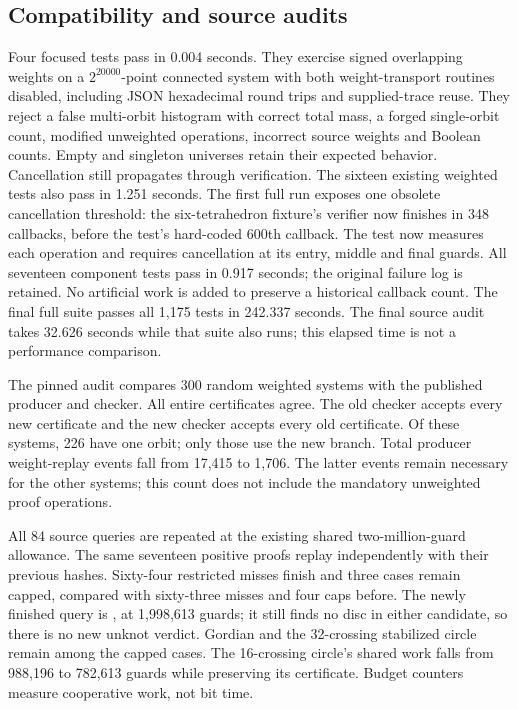\subsection{Compatibility and source audits}

Four focused tests pass in 0.004 seconds. They exercise signed overlapping
weights on a $2^{20000}$-point connected system with both weight-transport
routines disabled, including JSON hexadecimal round trips and supplied-trace
reuse. They reject a false multi-orbit histogram with correct total mass,
a forged single-orbit count, modified unweighted operations, incorrect source
weights and Boolean counts. Empty and singleton universes retain their
expected behavior. Cancellation still propagates through verification.
The sixteen existing weighted tests also pass in 1.251 seconds.
The first full run exposes one obsolete cancellation threshold: the
six-tetrahedron fixture's verifier now finishes in 348 callbacks, before
the test's hard-coded 600th callback. The test now measures each operation
and requires cancellation at its entry, middle and final guards. All
seventeen component tests pass in 0.917 seconds; the original failure log
is retained. No artificial work is added to preserve a historical callback
count.
The final full suite passes all 1,175 tests in 242.337 seconds. The final
source audit takes 32.626 seconds while that suite also runs; this elapsed
time is not a performance comparison.

The pinned audit compares 300 random weighted systems with the published
producer and checker. All entire certificates agree. The old checker accepts
every new certificate and the new checker accepts every old certificate.
Of these systems, 226 have one orbit; only those use the new branch. Total
producer weight-replay events fall from 17,415 to 1,706. The latter events
remain necessary for the other systems; this count does not include the
mandatory unweighted proof operations.

All 84 source queries are repeated at the existing shared two-million-guard
allowance. The same seventeen positive proofs replay independently with
their previous hashes. Sixty-four restricted misses finish and three cases
remain capped, compared with sixty-three misses and four caps before.
The newly finished query is , at 1,998,613 guards; it still finds no disc in
either candidate, so there is no new unknot verdict. Gordian and the
32-crossing stabilized circle remain among the capped cases. The 16-crossing
circle's shared work falls from 988,196 to 782,613 guards while preserving
its certificate. Budget counters measure cooperative work, not bit time.

